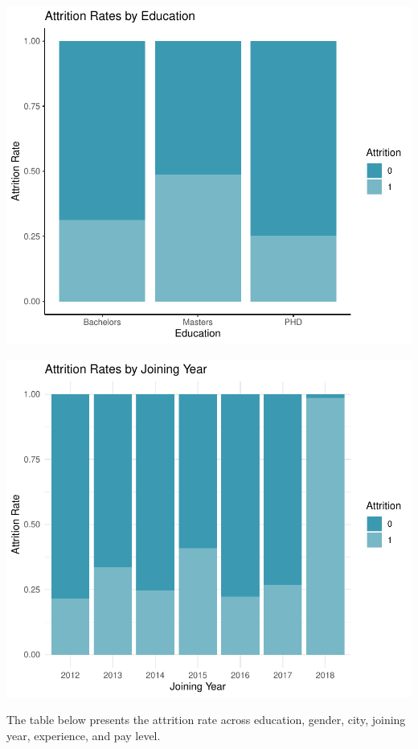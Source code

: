 \documentclass[11pt,preprint, authoryear]{elsarticle}
\numberwithin{equation}{section}
\numberwithin{figure}{section}
\numberwithin{table}{section}
\begin{document}
\includegraphics{Final_project_files/figure-latex/unnamed-chunk-7-1.pdf}

\includegraphics{Final_project_files/figure-latex/unnamed-chunk-8-1.pdf}

The table below presents the attrition rate across education, gender,
city, joining year, experience, and pay level.
\end{document}

